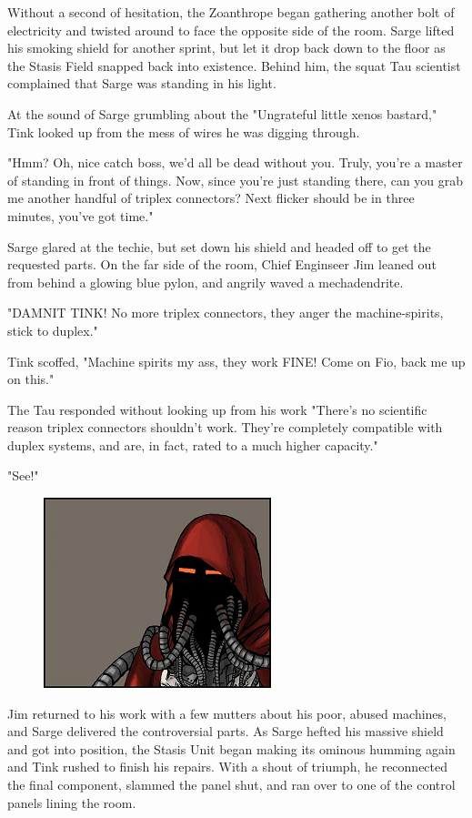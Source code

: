Without a second of hesitation, the Zoanthrope began gathering another bolt of electricity and twisted around to face the opposite side of the room. 
Sarge lifted his smoking shield for another sprint, but let it drop back down to the floor as the Stasis Field snapped back into existence. 
Behind him, the squat Tau scientist complained that Sarge was standing in his light.

At the sound of Sarge grumbling about the "Ungrateful little xenos bastard," Tink looked up from the mess of wires he was digging through. 


"Hmm? 
Oh, nice catch boss, we'd all be dead without you. 
Truly, you're a master of standing in front of things. 
Now, since you're just standing there, can you grab me another handful of triplex connectors? 
Next flicker should be in three minutes, you've got time."

Sarge glared at the techie, but set down his shield and headed off to get the requested parts. 
On the far side of the room, Chief Enginseer Jim leaned out from behind a glowing blue pylon, and angrily waved a mechadendrite.

"DAMNIT TINK! 
No more triplex connectors, they anger the machine-spirits, stick to duplex."

Tink scoffed, "Machine spirits my ass, they work FINE! 
Come on Fio, back me up on this."

The Tau responded without looking up from his work "There's no scientific reason triplex connectors shouldn't work. 
They're completely compatible with duplex systems, and are, in fact, rated to a much higher capacity."

"See!"

\begin{figure}
	\begin{center}
		\includegraphics[width=\figwidth]{pics/13/8.png}
	\end{center}
\end{figure}
Jim returned to his work with a few mutters about his poor, abused machines, and Sarge delivered the controversial parts. 
As Sarge hefted his massive shield and got into position, the Stasis Unit began making its ominous humming again and Tink rushed to finish his repairs. 
With a shout of triumph, he reconnected the final component, slammed the panel shut, and ran over to one of the control panels lining the room.

